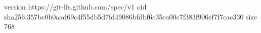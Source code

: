 version https://git-lfs.github.com/spec/v1
oid sha256:357bc0b0aad69c4f55db5d7fd49086bfdbf6c35ea00c7f383f906ef7f7cac330
size 768
